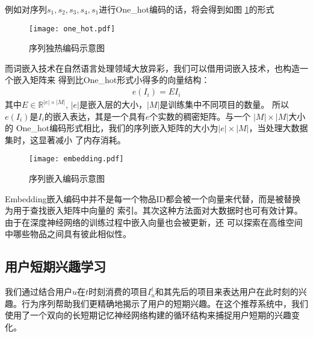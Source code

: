 例如对序列$s_{1},s_{2},s_{3},s_{4},s_{1}$进行One\_hot编码的话，将会得到如图%
\ref{fig:one_hot}的形式
\begin{figure}[htb]
  \centering
  \texttt{[image: one\_hot.pdf]}\\
  \caption{序列独热编码示意图}
  \label{fig:one_hot}
\end{figure}
而词嵌入技术在自然语言处理领域大放异彩，我们可以借用词嵌入技术，也构造一个嵌入矩阵来%
得到比One\_hot形式小得多的向量结构：
\begin{align}
e(I_i) = EI_i
\end{align}
其中$E\in \mathbb{R}^{|e|\times |M|}$, $|e|$是嵌入层的大小，$|M|$是训练集中不同项目的数量。%
所以$e(I_i)$是$I_i$的嵌入表达，其是一个具有$e$个实数的稠密矩阵。与一个 $|M|\times |M|$大小的%
One\_hot编码形式相比，我们的序列嵌入矩阵的大小为$|e|\times |M|$，当处理大数据集时，这显著减小%
了内存消耗。
\begin{figure}[htb]
  \centering
  \texttt{[image: embedding.pdf]}\\
  \caption{序列嵌入编码示意图}
  \label{fig:embedding}
\end{figure}
Embedding嵌入编码中并不是每一个物品ID都会被一个向量来代替，而是被替换为用于查找嵌入矩阵中向量的%
索引。其次这种方法面对大数据时也可有效计算。由于在深度神经网络的训练过程中嵌入向量也会被更新，还%
可以探索在高维空间中哪些物品之间具有彼此相似性。
\subsection{用户短期兴趣学习}
我们通过结合用户$u$在$t$时刻消费的项目$I_{u}^{t}$和其先后的项目来表达用户在此时刻的兴趣。行为序列帮助我们更精确地揭示了用户的短期兴趣。在这个推荐系统中，我们使用了一个双向的长短期记忆神经网络构建的循环结构来捕捉用户短期的兴趣变化。

